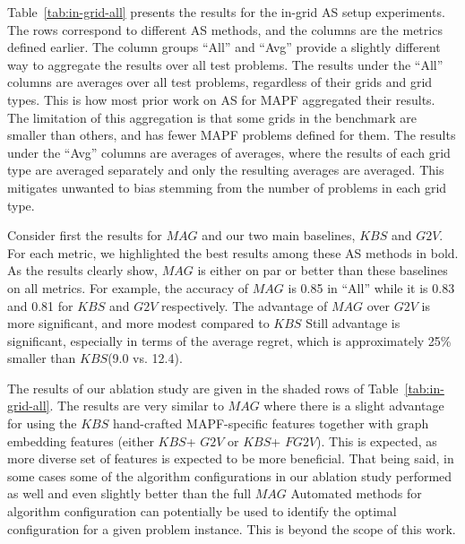 \documentclass[letterpaper]{article} %
\newcommand{\Carmel}[1]{}
\newcommand{\Roni}[1]{}
\newcommand{\gtv}[1]{\ensuremath{\textit{G2V}}\xspace}
\newcommand{\fgtv}[1]{\ensuremath{\textit{FG2V}}\xspace}
\newcommand{\kaduri}[1]{\ensuremath{\textit{KBS}}\xspace}
\newcommand{\mapfgas}[1]{\ensuremath{\textit{MAG}}\xspace}
\begin{document}
Table~\ref{tab:in-grid-all} presents the results for the in-grid AS setup experiments. 
The rows correspond to different AS methods, and the columns are the metrics defined earlier. 
The column groups ``All'' and ``Avg'' provide a slightly different way to aggregate the results over all test problems. 
The results under the ``All'' columns are averages over all test problems, regardless of their grids and grid types. 
This is how most prior work on AS for MAPF aggregated their results. 
The limitation of this aggregation is that some grids in the benchmark are smaller than others, and has fewer MAPF problems defined for them. 
The results under the ``Avg'' columns are averages of averages, where the results of each grid type are averaged separately and only the resulting averages are averaged. This mitigates unwanted to bias stemming from the number of problems in each grid type. 


Consider first the results for \mapfgas\ and our two main baselines, \kaduri\ and \gtv\ .
For each metric, we highlighted the best results among these AS methods in bold. 
As the results clearly show, \mapfgas\ is either on par or better than these baselines on all metrics. 
For example, the accuracy of \mapfgas\ is 0.85 in ``All'' while it is 0.83 and 0.81 for \kaduri\ and \gtv , respectively. 
The advantage of \mapfgas\ over \gtv\ is more significant, and more modest compared to \kaduri. 
Still advantage is significant, especially in terms of the average regret, which is approximately 25\% smaller than \kaduri\ (9.0 vs. 12.4). 

The results of our ablation study are given in the shaded rows of Table~\ref{tab:in-grid-all}. The results are very similar to \mapfgas, where there is a slight advantage for using the \kaduri\ hand-crafted MAPF-specific features together with graph embedding features (either \kaduri\ + \gtv\ or \kaduri\ + \fgtv\ ). 
This is expected, as more diverse set of features is expected to be more beneficial. That being said, in some cases some of the algorithm configurations in our ablation study performed as well and even slightly better than the full \mapfgas. Automated methods for algorithm configuration can potentially be used to identify the optimal configuration for a given problem instance. This is beyond the scope of this work. 
\end{document}

